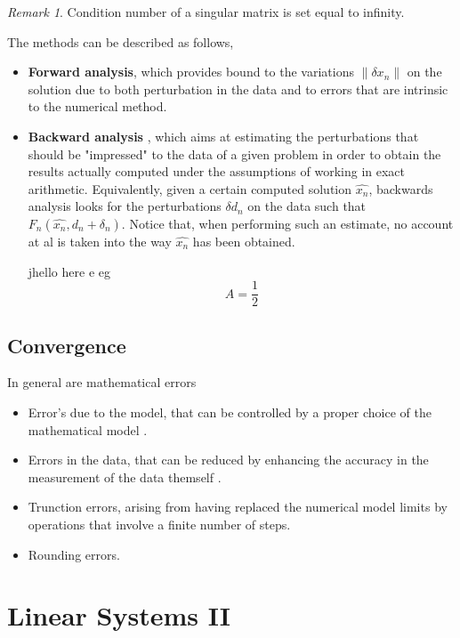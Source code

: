 \documentclass{article}
\theoremstyle{remark}
\newtheorem*{remark}{Remark}
\begin{document}
\begin{remark}
  Condition number of a singular matrix is set equal to infinity.
\end{remark}

\begin{definition}
  The methods can be described as follows,  
  \begin{itemize}
    \item \textbf{Forward analysis}, which provides bound to the variations $\|\delta x_{n}\|$ on the solution due to both perturbation in the data and to errors that are intrinsic to the numerical method.
  \item \textbf{Backward analysis} , which aims at estimating the perturbations that should be "impressed" to the data of a given problem in order to obtain the results actually computed under the assumptions of working in exact arithmetic. Equivalently, given a certain computed solution $\hat{x_n}$, backwards analysis looks for the perturbations $\delta d_{n}$ on the data such that $F_{n} \left( \hat{x_n}, d_n + \delta_n \right)$. Notice that, when performing such an
    estimate, no account at al is taken into the way $\hat{x_{n}}$ has been obtained.

    jhello here e eg 
    \[
    A = \frac{1}{2}
    \] 
  \end{itemize}
\end{definition}
  
\subsection{Convergence}%
\label{sub:convergence}


In general are mathematical errors 
\begin{itemize}
  \item Error's due to the model, that can be controlled by a proper choice of the mathematical model . 
  \item Errors in the data, that can be reduced by enhancing the accuracy in the measurement of the data themself .
  \item Trunction errors, arising from having replaced the numerical model limits by operations that involve a finite number of steps.
  \item Rounding errors.
\end{itemize}

\newpage
\section{Linear Systems II}%
\label{sec:linear_systems_ii}
\end{document}
